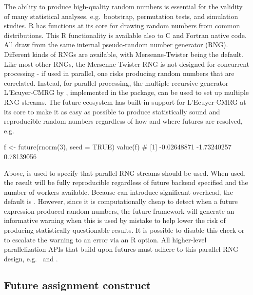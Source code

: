The ability to produce high-quality random numbers is essential for
the validity of many statistical analyses, e.g.\ bootstrap,
permutation tests, and simulation studies. R has functions at its core
for drawing random numbers from common distributions. This R
functionality is available also to C and Fortran native code. All draw
from the same internal pseudo-random number generator (RNG). Different
kinds of RNGs are available, with
Mersenne-Twister \citep{Matsumoto_Nishimura:1998} being the
default. Like most other RNGs, the Mersenne-Twister RNG is not
designed for concurrent processing - if used in parallel, one risks
producing random numbers that are correlated. Instead, for parallel
processing, the multiple-recursive generator L'Ecuyer-CMRG by
\citet{LEcuyer:1999}, implemented in the  package, can be
used to set up multiple RNG streams.
%
The future ecosystem has built-in support for L'Ecuyer-CMRG at its
core to make it as easy as possible to produce statistically sound and
reproducible random numbers regardless of how and where futures are
resolved, e.g.
\begin{example}
f <- future(rnorm(3), seed = TRUE)
value(f)
#  [1] -0.02648871 -1.73240257  0.78139056
\end{example}
Above,  is used to specify that parallel RNG
streams should be used.  When used, the result will be fully
reproducible regardless of future backend specified and the number of
workers available.  Because  can introduce
significant overhead, the default is .  However,
since it is computationally cheap to detect when a future expression
produced random numbers, the future framework will generate an
informative warning when this is used by mistake to help lower the
risk of producing statistically questionable results.  It is possible
to disable this check or to escalate the warning to an error via an R
option.
%
All higher-level parallelization APIs that build upon futures must
adhere to this parallel-RNG design, e.g.\ 
and .


\subsection{Future assignment construct}
\label{secFutureAssignmentConstruct}

